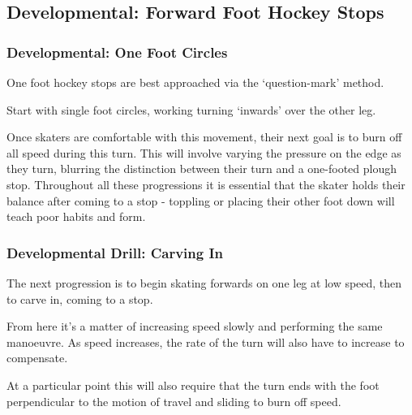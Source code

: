 \subsection{Developmental: Forward Foot Hockey Stops}

\subsubsection{Developmental: One Foot Circles}
One foot hockey stops are best approached via the `question-mark' method.

Start with single foot circles, working turning `inwards' over the other leg.

Once skaters are comfortable with this movement, their next goal is to burn off all speed during this turn.
This will involve varying the pressure on the edge as they turn, blurring the distinction between their turn and a one-footed plough stop.
Throughout all these progressions it is essential that the skater holds their balance after coming to a stop - toppling or placing their other foot down will teach poor habits and form.  


\subsubsection{Developmental Drill: Carving In}

The next progression is to begin skating forwards on one leg at low speed, then to carve in, coming to a stop. 

From here it's a matter of increasing speed slowly and performing the same manoeuvre.
As speed increases, the rate of the turn will also have to increase to compensate.

At a particular point this will also require that the turn ends with the foot perpendicular to the motion of travel and sliding to burn off speed. 


